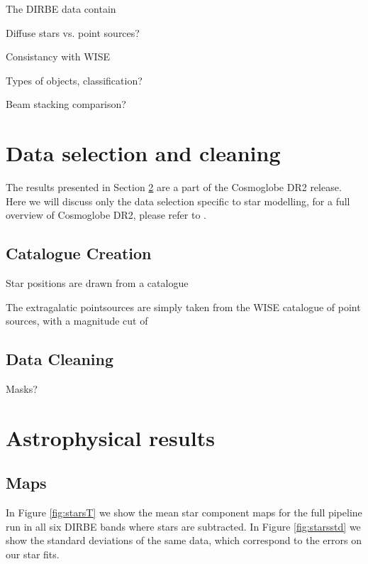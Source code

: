 \documentclass{aa}
\begin{document}
The DIRBE data contain 


Diffuse stars vs. point sources? 

Consistancy with WISE

Types of objects, classification?

Beam stacking comparison?

\clearpage
\section{Data selection and cleaning}
\label{sec:data}

The results presented in Section \ref{sec:results} are a part of the Cosmoglobe DR2 release. Here we will discuss only the data selection specific to star modelling, for a full overview of Cosmoglobe DR2, please refer to  \cite{CG02_01}.

\subsection{Catalogue Creation}
\label{sec:catalogue}

Star positions are drawn from a catalogue 

The extragalatic pointsources are simply taken from the WISE catalogue of point sources, with a magnitude cut of 

\subsection{Data Cleaning}

Masks?

\clearpage
\section{Astrophysical results}
\label{sec:results}

\subsection{Maps}

In Figure \ref{fig:starsT} we show the mean star component maps for the full pipeline run in all six DIRBE bands where stars are subtracted. In Figure \ref{fig:starsstd} we show the standard deviations of the same data, which correspond to the errors on our star fits. 
\end{document}
